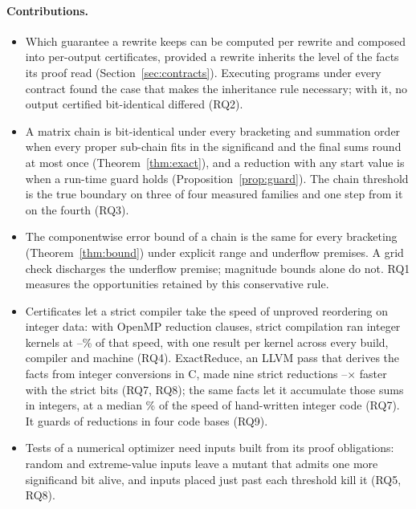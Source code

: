 \documentclass[acmsmall,review,anonymous,nonacm]{acmart}
\begin{document}
\paragraph{Contributions.}
\begin{itemize}
\item Which guarantee a rewrite keeps can be computed per rewrite and composed
into per-output certificates, provided a rewrite inherits the level of the
facts its proof read (Section~\ref{sec:contracts}). Executing
\RqTwoPrograms{} programs under every contract found the case that makes the
inheritance rule necessary; with it, no output certified bit-identical
differed (RQ2).
\item A matrix chain is bit-identical under every bracketing and summation order
when every proper sub-chain fits in the significand and the final sums round
at most once (Theorem~\ref{thm:exact}), and a reduction with any start value is
when a run-time guard holds (Proposition~\ref{prop:guard}). The chain
threshold is the true boundary on three of four measured families and one step
from it on the fourth (RQ3).
\item The componentwise error bound of a chain is the same for every bracketing
(Theorem~\ref{thm:bound}) under explicit range and underflow premises.
A grid check discharges the underflow premise; magnitude bounds alone do not.
RQ1 measures the opportunities retained by this conservative rule.
\item Certificates let a strict compiler take the speed of unproved reordering
on integer data: with OpenMP reduction clauses, strict compilation ran integer
kernels at \PlatStrictOfAlgebraicLo--\PlatStrictOfAlgebraicHi\% of that speed,
with one result per kernel across every build, compiler and machine (RQ4). ExactReduce,
an LLVM pass that derives the facts from integer conversions in C, made nine
strict reductions \LlvmBenchLicensedLo--\LlvmBenchLicensedHi$\times$ faster
with the strict bits (RQ7, RQ8); the same facts let it accumulate those sums in
integers, at a median \BaseRewriteOfIntMedian\% of the speed of hand-written
integer code (RQ7). It guards \LlvmScanVersioned{} of
\LlvmScanReductions{} reductions in four code bases (RQ9).
\item Tests of a numerical optimizer need inputs built from its proof
obligations: random and extreme-value inputs leave a mutant that admits one
more significand bit alive, and inputs placed just past each threshold kill it
(RQ5, RQ8).
\end{itemize}
\end{document}
